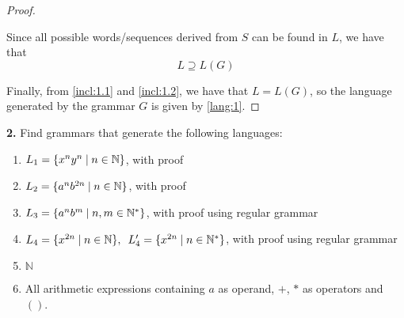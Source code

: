 \documentclass[11pt]{article}
\begin{document}
\begin{proof}
\begin{enumerate}
            Since all possible words/sequences derived from $S$ can be found in $L$,
            we have that 
            \begin{equation}\label{incl:1.2}
                L \supseteq L(G)
            \end{equation}
        \end{enumerate}
        Finally, from \eqref{incl:1.1} and \eqref{incl:1.2}, we have that $L = L(G)$, so
        the language generated by the grammar $G$ is given by \eqref{lang:1}.
    \end{proof}

    \vspace{2em}

    \noindent \textbf{2.} Find grammars that generate the following languages:
    \begin{enumerate}
        \item $L_1 = \{x^n y^n \hspace{0.25em} | \hspace{0.25em} n \in \mathbb{N}\}$, with proof
        \item $L_2 = \{a^n b^{2n} \hspace{0.25em} | \hspace{0.25em} n \in \mathbb{N}\}$, with proof
        \item $L_3 = \{a^n b^m \hspace{0.25em} | \hspace{0.25em} n, m \in \mathbb{N}^*\}$, 
            with proof using regular grammar
        \item $L_4 = \{x^{2n} \hspace{0.25em} | \hspace{0.25em} n \in \mathbb{N}\}, \hspace{0.5em}
            L_4' = \{x^{2n} \hspace{0.25em} | \hspace{0.25em} n \in \mathbb{N}^*\}$,
            with proof using regular grammar
        \item $\mathbb{N}$
        \item All arithmetic expressions containing $a$ as operand, $+$, $*$ as operators
            and $()$.
    \end{enumerate}

    \vspace{1em}
\end{document}
